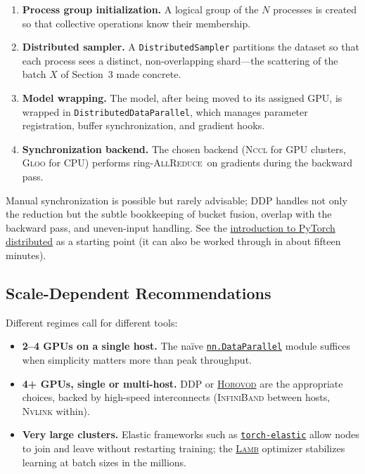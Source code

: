 \documentclass[11pt,a4paper]{article}
\theoremstyle{definition}
\theoremstyle{remark}
\theoremstyle{plain}
\newcommand{\allreduce}{\textsc{AllReduce}}
\begin{document}
\begin{enumerate}[leftmargin=1.8em, itemsep=2pt]
  \item \textbf{Process group initialization.} A logical group of the $N$
        processes is created so that collective operations know their
        membership.
  \item \textbf{Distributed sampler.} A \texttt{DistributedSampler}
        partitions the dataset so that each process sees a distinct,
        non-overlapping shard---the scattering of the batch $X$ of
        Section~3 made concrete.
  \item \textbf{Model wrapping.} The model, after being moved to its
        assigned GPU, is wrapped in \texttt{DistributedDataParallel},
        which manages parameter registration, buffer synchronization, and
        gradient hooks.
  \item \textbf{Synchronization backend.} The chosen backend
        (\textsc{Nccl} for GPU clusters, \textsc{Gloo} for CPU) performs
        ring-\allreduce\ on gradients during the backward pass.
\end{enumerate}

Manual synchronization is possible but rarely advisable; DDP handles not
only the reduction but the subtle bookkeeping of bucket fusion, overlap
with the backward pass, and uneven-input handling. See
the
\href{https://tinyurl.com/distributed-dp}{introduction to PyTorch
distributed} as a starting point (it can also be worked through in about
fifteen minutes).

\subsection{Scale-Dependent Recommendations}

Different regimes call for different tools:

\begin{itemize}[leftmargin=1.5em, itemsep=2pt]
  \item \textbf{2--4 GPUs on a single host.} The na\"ive
        \href{https://tinyurl.com/torch-data-parallel}{\texttt{nn.DataParallel}}
        module suffices when simplicity matters more than peak
        throughput.
  \item \textbf{4+ GPUs, single or multi-host.} DDP or
        \href{https://github.com/horovod/horovod}{\textsc{Horovod}} are
        the appropriate choices, backed by high-speed interconnects
        (\textsc{InfiniBand} between hosts, \textsc{Nvlink} within).
  \item \textbf{Very large clusters.} Elastic frameworks such as
        \href{https://tinyurl.com/torch-elastic}{\texttt{torch-elastic}}
        allow nodes to join and leave without restarting training; the
        \href{https://arxiv.org/abs/1904.00962}{\textsc{Lamb}} optimizer
        stabilizes learning at batch sizes in the millions.
\end{itemize}
\end{document}
